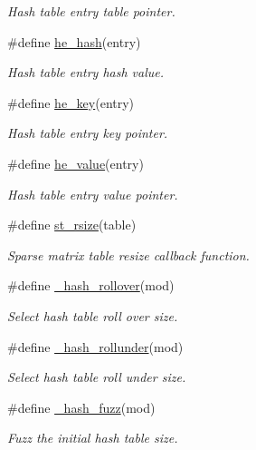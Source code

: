 \begin{CompactItemize}
\begin{CompactList}\small\item\em Hash table entry table pointer. \item\end{CompactList}\item 
\#define \hyperlink{group__dbprim__hash_ga43}{he\_\-hash}(entry)
\begin{CompactList}\small\item\em Hash table entry hash value. \item\end{CompactList}\item 
\#define \hyperlink{group__dbprim__hash_ga44}{he\_\-key}(entry)
\begin{CompactList}\small\item\em Hash table entry key pointer. \item\end{CompactList}\item 
\#define \hyperlink{group__dbprim__hash_ga45}{he\_\-value}(entry)
\begin{CompactList}\small\item\em Hash table entry value pointer. \item\end{CompactList}\item 
\#define \hyperlink{group__dbprim__hash_ga46}{st\_\-rsize}(table)
\begin{CompactList}\small\item\em Sparse matrix table resize callback function. \item\end{CompactList}\item 
\#define \hyperlink{group__dbprim__hash_ga47}{\_\-hash\_\-rollover}(mod)
\begin{CompactList}\small\item\em Select hash table roll over size. \item\end{CompactList}\item 
\#define \hyperlink{group__dbprim__hash_ga48}{\_\-hash\_\-rollunder}(mod)
\begin{CompactList}\small\item\em Select hash table roll under size. \item\end{CompactList}\item 
\#define \hyperlink{group__dbprim__hash_ga49}{\_\-hash\_\-fuzz}(mod)
\begin{CompactList}\small\item\em Fuzz the initial hash table size. \item\end{CompactList}\item 

\end{CompactItemize}
